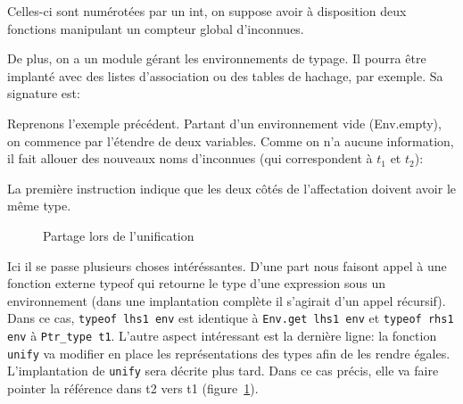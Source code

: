 Celles-ci sont numérotées par un int, on suppose avoir à disposition deux
fonctions manipulant un compteur global d'inconnues.


De plus, on a un module gérant les environnements de typage. Il pourra être
implanté avec des listes d'association ou des tables de hachage, par exemple. Sa
signature est:


Reprenons l'exemple précédent. Partant d'un environnement vide (Env.empty), on
commence par l'étendre de deux variables. Comme on n'a aucune information, il
fait allouer des nouveaux noms d'inconnues (qui correspondent à $t_1$ et $t_2$):


La première instruction indique que les deux côtés de l'affectation doivent
avoir le même type.


\begin{figure}
  \centering
  \caption{Partage lors de l'unification}
\label{fig:unifsharing}
\end{figure}

Ici il se passe plusieurs choses intéréssantes. D'une part nous faisont appel à
une fonction externe typeof qui retourne le type d'une expression sous un
environnement (dans une implantation complète il s'agirait d'un appel récursif).
Dans ce cas, \texttt{typeof lhs1 env} est identique à \texttt{Env.get lhs1 env}
et \texttt{typeof rhs1 env} à \texttt{Ptr\_type t1}. L'autre aspect intéressant
est la dernière ligne: la fonction \texttt{unify} va modifier en place les
représentations des types afin de les rendre égales. L'implantation de
\texttt{unify} sera décrite plus tard. Dans ce cas précis, elle va faire pointer
la référence dans t2 vers t1 (figure~\ref{fig:unifsharing}).


